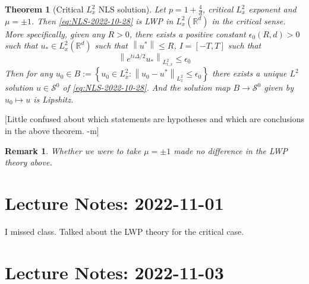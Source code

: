 \documentclass{article}
\def\purple{\color{Purple}}
\newcommand{\pnote}[1]{{\purple [#1]}} %
\newtheorem{theorem}{Theorem}
\newtheorem{remark}{Remark}
\def\R{\mathbb{R}} %
\newcommand\norm[1]{\left\lVert#1\right\rVert}
\begin{document}
\begin{theorem}[Critical $L_x^2$ NLS solution]
  \label{thm:critical-Lx2-NLS-solution}
  Let $p=1+\frac{4}{d}$, critical $L_{x}^{2}$ exponent and $\mu=\pm 1$. Then
  \cref{eq:NLS-2022-10-28} is LWP in $L_{x}^{2}(\R^d)$ in the critical sense.
  More specifically, given any $R>0$,  there exists a positive constant
  $\epsilon_{0}(R,d)>0$ such that $u_{*}\in L^{2}_{x}(\R^d)$ such that
  $\norm{u^{*}} \leq R$, $I=[-T,T]$  such that
  \begin{equation*}
    \norm{e^{ti\Delta/2}u_{*}}_{L_{t,x}^{2}} 
    \leq \epsilon_{0}
  \end{equation*}
  Then for any
  $u_{0}\in B:= \left\{ u_{0}\in L_{x}^{2}: \norm{u_{0}-u^{*}}_{L_{x}^{2}}\leq
    \epsilon_{0}\right\} $ there exists a unique $L^{2}$ solution
  $u\in \mathcal{S}^{0}$ of \cref{eq:NLS-2022-10-28}. And the solution map
  $B\to \mathcal{S}^{0}$ given by $u_{0}\mapsto u$ is Lipshitz.
\end{theorem} \pnote{Little confused about which statements are hypotheses and
  which are conclusions in the above theorem. -m}
\begin{remark}
  Whether we were to take $\mu=\pm 1$ made no difference in the LWP theory
  above.
\end{remark}
\section{Lecture Notes: 2022-11-01}
I missed class. Talked about the LWP theory for the critical case.
\section{Lecture Notes: 2022-11-03}
\end{document}
